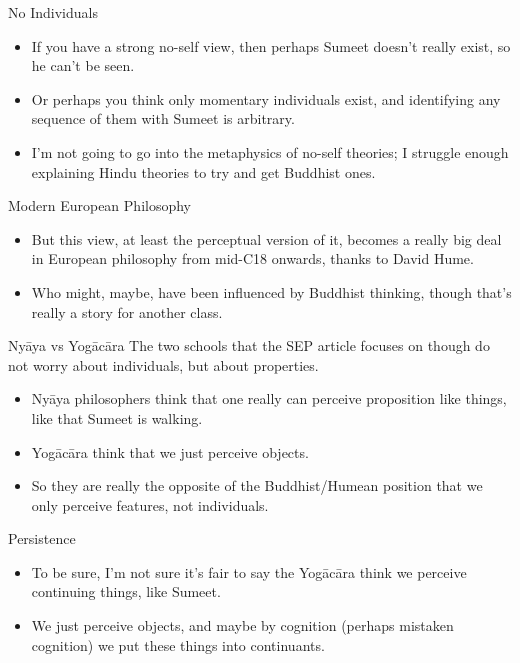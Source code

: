 \documentclass[
  17pt,
  letterpaper,
  ignorenonframetext,
  aspectratio=169,
]{beamer}
\providecommand{\tightlist}{%
  \setlength{\itemsep}{0pt}\setlength{\parskip}{0pt}}\usepackage{longtable,booktabs,array}
\begin{document}
\begin{frame}{No Individuals}
\protect\hypertarget{no-individuals}{}
\begin{itemize}[<+->]
\tightlist
\item
  If you have a strong no-self view, then perhaps Sumeet doesn't really
  exist, so he can't be seen.
\item
  Or perhaps you think only momentary individuals exist, and identifying
  any sequence of them with Sumeet is arbitrary.
\item
  I'm not going to go into the metaphysics of no-self theories; I
  struggle enough explaining Hindu theories to try and get Buddhist
  ones.
\end{itemize}
\end{frame}

\begin{frame}{Modern European Philosophy}
\protect\hypertarget{modern-european-philosophy}{}
\begin{itemize}[<+->]
\tightlist
\item
  But this view, at least the perceptual version of it, becomes a really
  big deal in European philosophy from mid-C18 onwards, thanks to David
  Hume.
\item
  Who might, maybe, have been influenced by Buddhist thinking, though
  that's really a story for another class.
\end{itemize}
\end{frame}

\begin{frame}{Nyāya vs Yogācāra}
\protect\hypertarget{nyux101ya-vs-yogux101cux101ra}{}
The two schools that the SEP article focuses on though do not worry
about individuals, but about properties.

\begin{itemize}[<+->]
\tightlist
\item
  Nyāya philosophers think that one really can perceive proposition like
  things, like that Sumeet is walking.
\item
  Yogācāra think that we just perceive objects.
\item
  So they are really the opposite of the Buddhist/Humean position that
  we only perceive features, not individuals.
\end{itemize}
\end{frame}

\begin{frame}{Persistence}
\protect\hypertarget{persistence}{}
\begin{itemize}[<+->]
\tightlist
\item
  To be sure, I'm not sure it's fair to say the Yogācāra think we
  perceive continuing things, like Sumeet.
\item
  We just perceive objects, and maybe by cognition (perhaps mistaken
  cognition) we put these things into continuants.
\end{itemize}
\end{frame}
\end{document}
